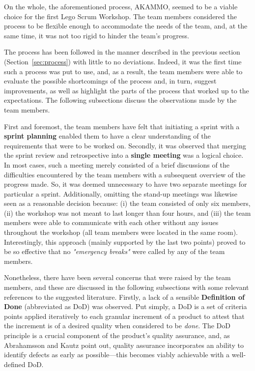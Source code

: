 \documentclass[conference]{IEEEtran}
\begin{document}
On the whole, the aforementioned process, {\selectfont AKAMMO},
seemed to be a viable choice for the first Lego Scrum Workshop. The team members
considered the process to be flexible enough to accommodate the needs of the
team, and, at the same time, it was not too rigid to hinder the team's progress.

The process has been followed in the manner described in the previous section
(Section~\ref{sec:process}) with little to no deviations. Indeed, it was the
first time such a process was put to use, and, as a result, the team members
were able to evaluate the possible shortcomings of the process and, in turn,
suggest improvements, as well as highlight the parts of the process that worked
up to the expectations. The following subsections discuss the observations made
by the team members.

First and foremost, the team members have felt that initiating a sprint with a 
\textbf{sprint planning} enabled them to have a clear understanding of the requirements
that were to be worked on. Secondly, it was observed that merging the sprint
review and retrospective into a \textbf{single meeting} was a logical choice. In most
cases, such a meeting merely consisted of a brief discussions of the difficulties
encountered by the team members with a subsequent overview of the progress made.
So, it was deemed unnecessary to have two separate meetings for particular a sprint.
Additionally, omitting the stand-up meetings was likewise seen as a reasonable
decision because: (i) the team consisted of only six members, (ii) the workshop
was not meant to last longer than four hours, and (iii) the team members were
able to communicate with each other without any issues throughout the workshop
(all team members were located in the same room). Interestingly, this approach
(mainly supported by the last two points) proved to be so effective that no
\textit{"emergency breaks"} were called by any of the team members.

Nonetheless, there have been several concerns that were raised by the team
members, and these are discussed in the following subsections with some
relevant references to the suggested literature. Firstly, a lack of a sensible
\textbf{Definition of Done} (abbreviated as DoD) was observed. Put simply, a
DoD is a set of criteria points applied iteratively to each granular increment
of a product to attest that the increment is of a desired quality
\cite{Kopczynska2022} when considered to be \textit{done}. The DoD principle is
a crucial component of the product's quality assurance, and, as Abrahamsson and
Kautz \cite{Abrahamsson2002} point out, quality assurance incorporates an
ability to identify defects as early as possible---this becomes viably
achievable with a well-defined DoD.
\end{document}
